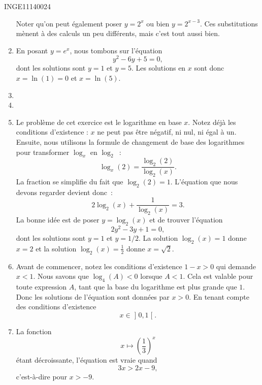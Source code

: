 \begin{corrige}{INGE11140024}
\begin{enumerate}
			Noter qu'on peut également poser $y=2^x$ ou bien $y=2^{x-3}$. Ces substitutions mènent à des calculs un peu différents, mais c'est tout aussi bien.
		\item
			En posant $y=e^x$, nous tombons sur l'équation
			\begin{equation}
				y^2-6y+5=0,
			\end{equation}
			dont les solutions sont $y=1$ et $y=5$. Les solutions en $x$ sont donc $x=\ln(1)=0$ et $x=\ln(5)$.
		\item
		\item
		\item
			Le problème de cet exercice est le logarithme en base $x$. Notez déjà les conditions d'existence : $x$ ne peut pas être négatif, ni nul, ni égal à un. Ensuite, nous utilisons la formule de changement de base des logarithmes pour transformer $\log_x$ en $\log_2$~:
			\begin{equation}
				\log_x(2)=\frac{ \log_2(2) }{ \log_2(x) }.
			\end{equation}
			La fraction se simplifie du fait que $\log_2(2)=1$. L'équation que nous devons regarder devient donc~:
			\begin{equation}
				2\log_2(x)+\frac{1}{ \log_2(x) }=3.
			\end{equation}
			La bonne idée est de poser $y=\log_2(x)$ et de trouver l'équation
			\begin{equation}
				2y^2-3y+1=0,
			\end{equation}
			dont les solutions sont $y=1$ et $y=1/2$. La solution $\log_2(x)=1$ donne $x=2$ et la solution $\log_2(x)=\frac{1}{ 2 }$ donne $x=\sqrt{2}$.
		\item
			Avant de commencer, notez les conditions d'existence $1-x>0$ qui demande $x<1$.	Nous savons que $\log_4(A)<0$ lorsque $A<1$. Cela est valable pour toute expression $A$, tant que la base du logarithme est plus grande que $1$. Donc les solutions de l'équation sont données par $x>0$. En tenant compte des conditions d'existence
			\begin{equation}
				x\in\mathopen] 0 , 1 \mathclose[.
			\end{equation}
			
		\item
			La fonction
			\begin{equation}
				x\mapsto\left( \frac{ 1 }{ 3 } \right)^x
			\end{equation}
			étant décroissante, l'équation est vraie quand 
			\begin{equation}
				3x>2x-9,
			\end{equation}
			c'est-à-dire pour $x>-9$.
			

	\end{enumerate}

\end{corrige}
